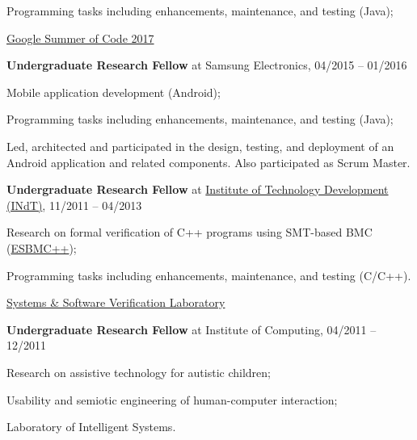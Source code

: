 \documentclass[letterpaper]{article}
\renewenvironment{itemize}{
  \begin{list}{}{
    \setlength{\leftmargin}{1.5em}
  }
}{
  \end{list}
}
\begin{document}
\begin{enumerate}
\begin{itemize}
        \item{\textendash} {Programming tasks including enhancements, maintenance, and testing (Java);}
        \item{\textendash} \href{https://summerofcode.withgoogle.com/archive/2017/projects/6689181245898752/}{Google Summer of Code 2017}
      \end{itemize}
      \item{{\bf Undergraduate Research Fellow} at Samsung Electronics, 04/2015 -- 01/2016}
      \begin{itemize}
        \item{\textendash} {Mobile application development (Android);}
        \item{\textendash} {Programming tasks including enhancements, maintenance, and testing (Java);}
        \item{\textendash} {Led, architected and participated in the design, testing, and deployment of an Android application and related components. Also participated as Scrum Master.}
      \end{itemize}
      \item{{\bf Undergraduate Research Fellow} at \href{http://www.indt.org.br}{Institute of Technology Development (INdT)}, 11/2011 -- 04/2013}
            \begin{itemize}
        \item{\textendash} {Research on formal verification of C++ programs using SMT-based BMC (\href{http://www.esbmc/}{ESBMC++});}
        \item{\textendash} {Programming tasks including enhancements, maintenance, and testing (C/C++).}
        \item{\textendash} \href{https://ssvlab.github.io}{Systems \& Software Verification Laboratory}
      \end{itemize}
      \item{{\bf Undergraduate Research Fellow} at Institute of Computing, 04/2011 -- 12/2011}
            \begin{itemize}
        \item{\textendash} {Research on assistive technology for autistic children;}
        \item{\textendash} {Usability and semiotic engineering of human-computer interaction;}
        \item{\textendash} {Laboratory of Intelligent Systems.}
      \end{itemize}
    \end{enumerate}
    
\end{document}
